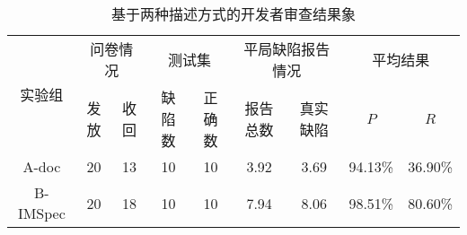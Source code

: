 \begin{table}[b]
	\centering
	\begin{minipage}[t]{\linewidth} %
		\caption{基于两种描述方式的开发者审查结果象}
		\label{tab:2-5-survey}
			\begin{tabular}{ccccccccc}
			\hline
			\multirow{2}{*}{实验组} & \multicolumn{2}{c}{问卷情况} & \multicolumn{2}{c}{测试集} & \multicolumn{2}{c}{平局缺陷报告情况} & \multicolumn{2}{c}{平均结果} \\
			\cline{2-9}
			& 发放 & 收回 & 缺陷数& 正确数& 报告总数 & 真实缺陷 & $P$ & $R$ \\
			\hline
		A-doc	& 20 & 13 & 10& 10& 3.92 & 3.69 & 94.13\% & 36.90\% \\
		 B-IMSpec	& 20 & 18 & 10& 10& 7.94 & 8.06 & 98.51\% & 80.60\% \\
			\hline
		\end{tabular}
	\end{minipage}
\end{table}